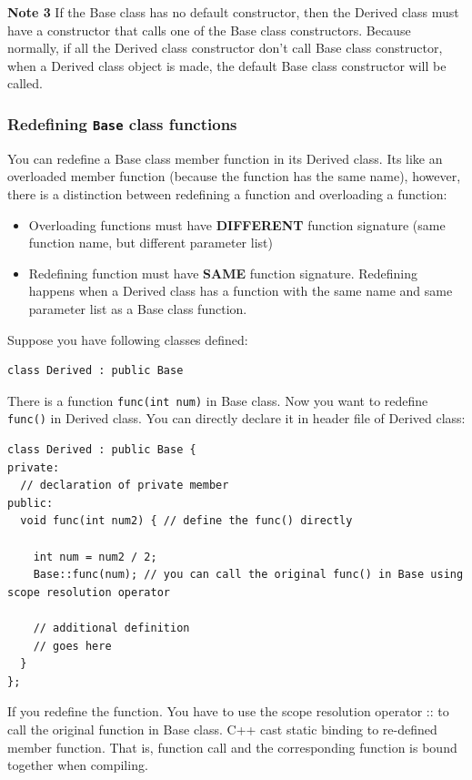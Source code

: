 \documentclass[11pt]{book}
\begin{document}
\textbf{Note 3}
If the Base class has no default constructor, then the Derived class must have a constructor that calls one of the Base class constructors. Because normally, if all the Derived class constructor don't call Base class constructor, when a Derived  class object is made, the default Base class constructor will be called.

\subsubsection{Redefining \texttt{Base} class functions}
\label{sec:orga803a46}
You can redefine a Base class member function in its Derived  class. Its like an overloaded member function (because the function has the same name), however, there is a distinction between redefining a function and overloading a function:
\begin{itemize}
\item Overloading functions must have \textbf{DIFFERENT} function signature (same function name, but different parameter list)
\item Redefining function must have \textbf{SAME} function signature. Redefining happens when a Derived class has a function with the same name and same parameter list as a Base class function.
\end{itemize}

Suppose you have following classes defined:
\begin{verbatim}
class Derived : public Base
\end{verbatim}

There is a function \texttt{func(int num)} in Base class. Now you want to redefine \texttt{func()} in Derived class. You can directly declare it in header file of Derived class:
\begin{verbatim}
class Derived : public Base {
private:
  // declaration of private member
public:
  void func(int num2) { // define the func() directly

    int num = num2 / 2;
    Base::func(num); // you can call the original func() in Base using scope resolution operator 

    // additional definition
    // goes here
  }
};
\end{verbatim}

If you redefine the function. You have to use the scope resolution operator :: to call the original function in Base class. C++ cast static binding to re-defined member function. That is, function call and the corresponding function is bound together when compiling.
\end{document}
